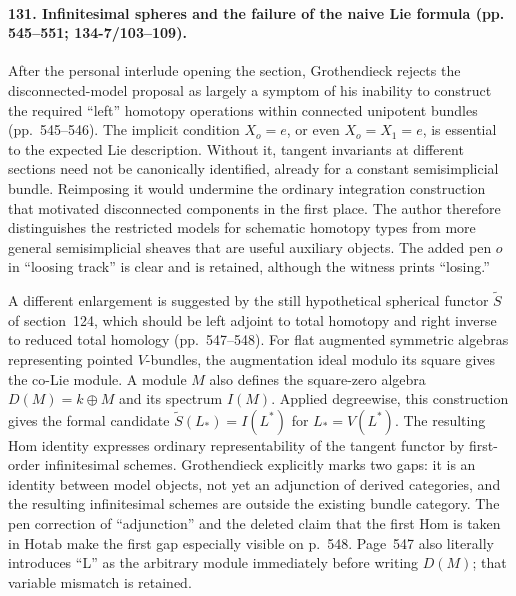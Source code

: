 \paragraph{131. Infinitesimal spheres and the failure of the naive Lie formula (pp. 545--551; 134-7/103--109).}
After the personal interlude opening the section, Grothendieck rejects the disconnected-model proposal as largely a symptom of his inability to construct the required ``left'' homotopy operations within connected unipotent bundles (pp.~545--546). The implicit condition $X_o=e$, or even $X_o=X_1=e$, is essential to the expected Lie description. Without it, tangent invariants at different sections need not be canonically identified, already for a constant semisimplicial bundle. Reimposing it would undermine the ordinary integration construction that motivated disconnected components in the first place. The author therefore distinguishes the restricted models for schematic homotopy types from more general semisimplicial sheaves that are useful auxiliary objects. The added pen $o$ in ``loosing track'' is clear and is retained, although the witness prints ``losing.''

A different enlargement is suggested by the still hypothetical spherical functor $\widetilde S$ of section~124, which should be left adjoint to total homotopy and right inverse to reduced total homology (pp.~547--548). For flat augmented symmetric algebras representing pointed $V$-bundles, the augmentation ideal modulo its square gives the co-Lie module. A module $M$ also defines the square-zero algebra $D(M)=k\oplus M$ and its spectrum $I(M)$. Applied degreewise, this construction gives the formal candidate $\widetilde S(L_*)=I(L^*)$ for $L_*=V(L^*)$. The resulting Hom identity expresses ordinary representability of the tangent functor by first-order infinitesimal schemes. Grothendieck explicitly marks two gaps: it is an identity between model objects, not yet an adjunction of derived categories, and the resulting infinitesimal schemes are outside the existing bundle category. The pen correction of ``adjunction'' and the deleted claim that the first Hom is taken in $\mathrm{Hotab}$ make the first gap especially visible on p.~548. Page~547 also literally introduces ``L'' as the arbitrary module immediately before writing $D(M)$; that variable mismatch is retained.

